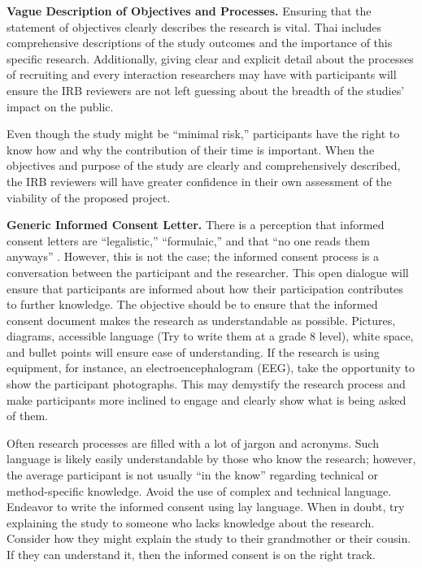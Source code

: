 \documentclass[
  11pt,
]{book}
\begin{document}
\textbf{Vague Description of Objectives and Processes.} Ensuring that the statement of objectives clearly describes the research is vital. Thai includes comprehensive descriptions of the study outcomes and the importance of this specific research. Additionally, giving clear and explicit detail about the processes of recruiting and every interaction researchers may have with participants will ensure the IRB reviewers are not left guessing about the breadth of the studies' impact on the public.

Even though the study might be ``minimal risk,'' participants have the right to know how and why the contribution of their time is important. When the objectives and purpose of the study are clearly and comprehensively described, the IRB reviewers will have greater confidence in their own assessment of the viability of the proposed project.

\textbf{Generic Informed Consent Letter.} There is a perception that informed consent letters are ``legalistic,'' ``formulaic,'' and that ``no one reads them anyways'' \citep[p.~19]{drolet_ethical_2023}. However, this is not the case; the informed consent process is a conversation between the participant and the researcher. This open dialogue will ensure that participants are informed about how their participation contributes to further knowledge. The objective should be to ensure that the informed consent document makes the research as understandable as possible. Pictures, diagrams, accessible language (Try to write them at a grade 8 level), white space, and bullet points will ensure ease of understanding. If the research is using equipment, for instance, an electroencephalogram (EEG), take the opportunity to show the participant photographs. This may demystify the research process and make participants more inclined to engage and clearly show what is being asked of them.

Often research processes are filled with a lot of jargon and acronyms. Such language is likely easily understandable by those who know the research; however, the average participant is not usually ``in the know'' regarding technical or method-specific knowledge. Avoid the use of complex and technical language. Endeavor to write the informed consent using lay language. When in doubt, try explaining the study to someone who lacks knowledge about the research. Consider how they might explain the study to their grandmother or their cousin. If they can understand it, then the informed consent is on the right track.
\end{document}

